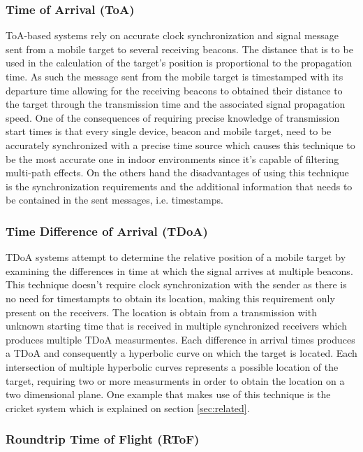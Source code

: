 \subsubsection{Time of Arrival (ToA) }
\label{subsubsec:toa}

\ac{ToA}-based systems rely on accurate clock synchronization and signal message sent from a mobile target to several receiving beacons. The distance that is to be used in the calculation of the target's position is proportional to the propagation time. As such the message sent from the mobile target is timestamped with its departure time allowing for the receiving beacons to obtained their distance to the target through the transmission time and the associated signal propagation speed.
One of the consequences of requiring precise knowledge of transmission start times is that every single device, beacon and mobile target, need to be accurately synchronized with a precise time source which causes this technique to be the most accurate one in indoor environments since it's capable of filtering multi-path effects. On the others hand the disadvantages of using this technique is the synchronization requirements and the additional information that needs to be contained in the sent messages, i.e. timestamps. 


\subsubsection{Time Difference of Arrival (TDoA) }
\label{subsubsec:tdoa}

\ac{TDoA} systems attempt to determine the relative position of a mobile target by examining the differences in time at which the signal arrives at multiple beacons. This technique doesn't require clock synchronization with the sender as there is no need for timestampts to obtain its location, making this requirement only present on the receivers. The location is obtain from a transmission with unknown starting time that is received in multiple synchronized receivers which produces multiple \ac{TDoA} measurmentes. Each difference in arrival times produces a \ac{TDoA} and consequently a hyperbolic curve on which the target is located. Each intersection of multiple hyperbolic curves represents a possible location of the target, requiring two or more measurments in order to obtain the location on a two dimensional plane. One example that makes use of this technique is the cricket system which is explained on section \ref{sec:related}.


\subsubsection{Roundtrip Time of Flight (RToF)}
\label{subsubsec:rtfo}


